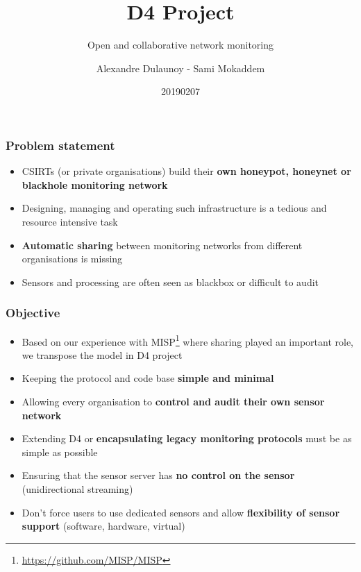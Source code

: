 \documentclass{beamer}
\title{D4 Project}
\subtitle{Open and collaborative network monitoring}
\author{Alexandre Dulaunoy - Sami Mokaddem}
\institute{Team CIRCL \\ \url{https://www.d4-project.org/}}
\date{20190207}
\begin{document}
    \begin{frame}
        \maketitle
    \end{frame}

\begin{frame}
        \frametitle{Problem statement}
        \begin{itemize}
                \item CSIRTs (or private organisations) build their {\bf own honeypot, honeynet or blackhole monitoring network}
                \item Designing, managing and operating such infrastructure is a tedious and resource intensive task
                \item {\bf Automatic sharing} between monitoring networks from different organisations is missing
                \item Sensors and processing are often seen as blackbox or difficult to audit

        \end{itemize}
\end{frame}


\begin{frame}
 \frametitle{Objective}
 \begin{itemize}
         \item Based on our experience with MISP\footnote{\url{https://github.com/MISP/MISP}} where sharing played an important role, we transpose
                 the model in D4 project
         \item Keeping the protocol and code base {\bf simple and minimal}
         \item Allowing every organisation to {\bf control and audit their own sensor network}
         \item Extending D4 or {\bf encapsulating legacy monitoring protocols} must be as simple as possible
         \item Ensuring that the sensor server has {\bf no control on the sensor} (unidirectional streaming)
         \item Don't force users to use dedicated sensors and allow {\bf flexibility of sensor support} (software, hardware, virtual)

 \end{itemize}
\end{frame}
\end{document}
